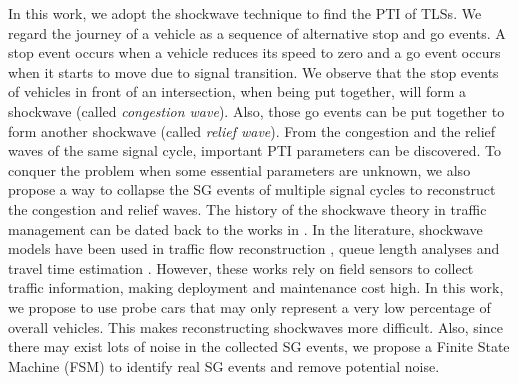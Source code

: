 \documentclass[final,oneside,onecolumn,12pt,a4paper]{book}%
\begin{document}
In this work, we adopt the shockwave technique \cite{Lighthill1955KinematicI}%
\cite{Lighthill1955KinematicII} to find the PTI of TLSs. We regard the
journey of a vehicle as a sequence of alternative stop and go events. A stop
event occurs when a vehicle reduces its speed to zero and a go event occurs
when it starts to move due to signal transition. We observe that the stop
events of vehicles in front of an intersection, when being put together, will
form a shockwave (called \emph{congestion wave}). Also, those go events can be
put together to form another shockwave (called \emph{relief wave}). From the
congestion and the relief waves of the same signal cycle, important PTI
parameters can be discovered. To conquer the problem when some essential
parameters are unknown, we also propose a way to collapse the SG events of
multiple signal cycles to reconstruct the congestion and relief waves. The
history of the shockwave theory in traffic management can be dated back to the
works in \cite{Lighthill1955KinematicI}\cite{Lighthill1955KinematicII}. In the
literature, shockwave models have been used in traffic flow reconstruction
\cite{Herrera2007Traffic}, queue length analyses \cite{Liu2009Real}%
\cite{Ban2011Real} and travel time estimation \cite{Skabardonis2008Real}.
However, these works rely on field sensors to collect traffic information,
making deployment and maintenance cost high. In this work, we propose to use
probe cars that may only represent a very low percentage of overall vehicles.
This makes reconstructing shockwaves more difficult. Also, since there may
exist lots of noise in the collected SG events, we propose
a Finite State Machine (FSM) to identify real SG events and remove potential noise.
\end{document}
